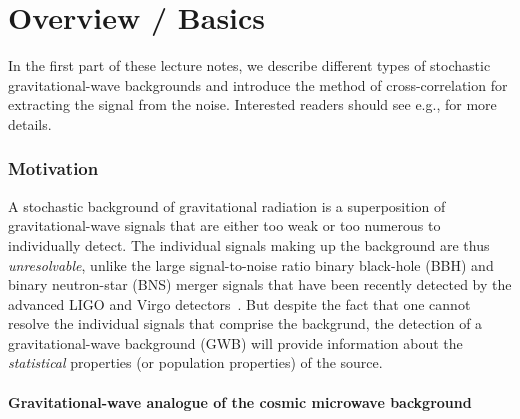\part{Overview / Basics}
\label{p:overview}

In the first part of these lecture notes, we describe 
different types of stochastic gravitational-wave 
backgrounds and introduce the
method of cross-correlation for extracting the signal
from the noise.
Interested readers should see e.g., 
\cite{Allen:1997, Allen-Romano:1999, Romano-Cornish:2017}
for more details.

\section{Motivation}
\label{s:motivation}

A stochastic background of gravitational radiation 
is a superposition of gravitational-wave signals that
are either too weak or too numerous to individually detect.
The individual signals making up the background are thus
{\em unresolvable}, unlike the large signal-to-noise ratio
binary black-hole (BBH) and binary neutron-star (BNS)
merger signals that have been recently detected by the 
advanced LIGO and Virgo 
detectors~\cite{TheLIGOScientific:2016-GW150914,
TheLIGOScientific:2017-GW170817,TheLIGOScientific:2018-GWTC-1}.
But despite the fact that one cannot resolve the individual  
signals that comprise the backgrund, the detection of a 
gravitational-wave background (GWB) will provide information 
about the 
{\em statistical} properties (or population properties)
of the source.

\subsection{Gravitational-wave analogue of the cosmic
microwave background}
\label{s:GW_CMB}

